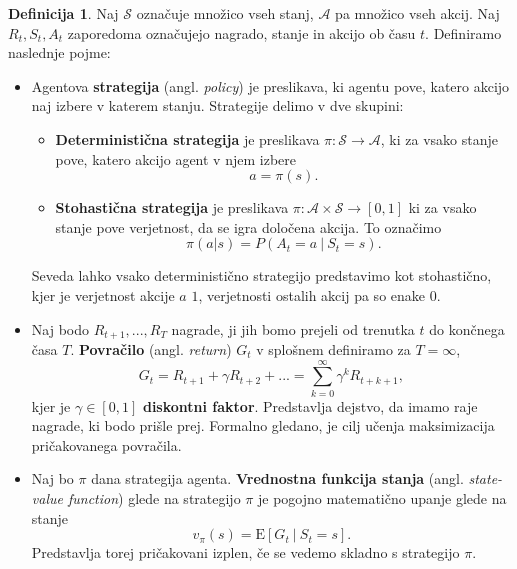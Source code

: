 \documentclass[12pt,a4paper]{amsart}
\theoremstyle{definition} %
\newtheorem{definicija}{Definicija}[section]
\theoremstyle{plain} %
\begin{document}
\begin{definicija}
    Naj $\mathcal{S}$ označuje množico vseh stanj, $\mathcal{A}$ pa množico vseh akcij. Naj $R_t,
    S_t, A_t$ zaporedoma označujejo nagrado, stanje in akcijo ob času $t$. Definiramo naslednje 
    pojme: 
    \begin{itemize}
        \item   Agentova \textbf{strategija} (angl. \textit{policy}) je preslikava, ki agentu pove, 
                katero akcijo naj izbere v katerem stanju. Strategije delimo v dve skupini:
                \begin{itemize}
                    \item \textbf{Deterministična strategija} je preslikava $\pi: \mathcal{S} 
                    \rightarrow \mathcal{A}$, ki za vsako stanje pove, katero akcijo agent v njem 
                    izbere
                    $$
                    a = \pi(s).
                    $$
                    \item \textbf{Stohastična strategija} je preslikava $\pi: \mathcal{A} \times 
                    \mathcal{S} \rightarrow [0, 1]$ ki za vsako stanje pove verjetnost, da se igra 
                    določena akcija. To označimo 
                    $$
                    \pi(a | s) = P(A_t = a~|~S_t = s).
                    $$
                \end{itemize}
                Seveda lahko vsako deterministično strategijo predstavimo kot stohastično, kjer je 
                verjetnost akcije $a$ $1$, verjetnosti ostalih akcij pa so enake $0$.
        
        \item Naj bodo $R_{t+1}, ...,R_T$ nagrade, ji jih bomo prejeli od trenutka 
                $t$ do končnega časa $T$. \textbf{Povračilo} (angl. \textit{return}) $G_t$ v splošnem
                definiramo za $T=\infty$,
                $$
                G_t = R_{t+1} + \gamma R_{t+2} + ... = \sum_{k=0}^\infty \gamma^k R_{t + k + 1} ,
                $$
                kjer je $\gamma \in [0,1]$ \textbf{diskontni faktor}. Predstavlja dejstvo, da 
                imamo raje nagrade, ki bodo prišle prej. Formalno gledano, je cilj učenja 
                maksimizacija pričakovanega povračila.

         \item Naj bo $\pi$ dana strategija agenta. \textbf{Vrednostna funkcija 
                stanja} (angl. \textit{state-value function}) glede na strategijo $\pi$ je 
                pogojno matematično upanje glede na stanje
                $$
                v_\pi(s) = \mathrm{E} [G_t~|~S_t = s].
                $$
                Predstavlja torej pričakovani izplen, če se vedemo skladno s strategijo $\pi$.


\end{itemize}
\end{definicija}
\end{document}
